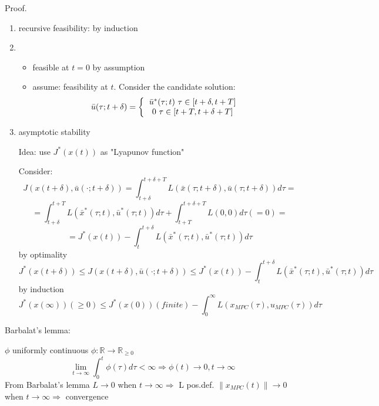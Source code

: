 Proof.
\begin{enumerate}
\item recursive feasibility: by induction
\item 
\begin{itemize}
\item feasible at $t=0$ by assumption
\item assume: feasibility at $t$. Consider the candidate solution:
\begin{equation*}
\bar u(\tau; t+\delta) =
\left \{
  \begin{tabular}{c}
  $\bar u^*(\tau;t) \ \tau \in [t+\delta, t+ T]$ \\
  $0 \ \tau \in [t+T, t+\delta+T]$ 
  \end{tabular}
  \right.
\end{equation*}
\end{itemize}
\item asymptotic stability

Idea: use $J^*(x(t))$ as "Lyapunov function"

Consider: 
\begin{equation*}
J(x(t+\delta), \bar u(\cdot;t+\delta)) = \int_{t+\delta}^{t+\delta + T} L(\bar x(\tau;t+\delta), \bar u(\tau; t+\delta))d\tau=
\end{equation*} 
\begin{equation*}
= \int_{t+\delta}^{t+T}L(\bar x^*(\tau;t), \bar u^*(\tau;t))d\tau + \int_{t+T}^{t+\delta+T}L(0,0)d\tau (=0) = 
\end{equation*}
\begin{equation*}
= J^*(x(t)) - \int_{t}^{t+\delta} L(\bar x^*(\tau;t), \bar u^*(\tau;t))d\tau
\end{equation*}
by optimality 
\begin{equation*}
J^*(x(t+\delta)) \leq J(x(t+\delta), \bar u(\cdot;t+\delta)) \leq J^*(x(t)) - \int_{t}^{t+\delta} L(\bar x^*(\tau;t), \bar u^*(\tau;t))d \tau
\end{equation*}
by induction
\begin{equation*}
J^*(x(\infty)) (\geq 0) \leq J^*(x(0)) (finite) - \int_0^{\infty}L(x_{MPC}(\tau), u_{MPC}(\tau))d\tau
\end{equation*}
\end{enumerate}

Barbalat's lemma:

$\phi$ uniformly continuous $\phi: \mathbb{R} \to \mathbb{R}_{\geq 0}$
\begin{equation*}
\lim_{t \to \infty} \int_0^t \phi(\tau)d\tau < \infty \Rightarrow \phi(t)\to 0, t \to \infty
\end{equation*}
From Barbalat's lemma
$L \to 0 $ when $t \to \infty \Rightarrow $ L pos.def. $\|x_{MPC}(t)\| \to 0$ when $t \to \infty \Rightarrow$ convergence

